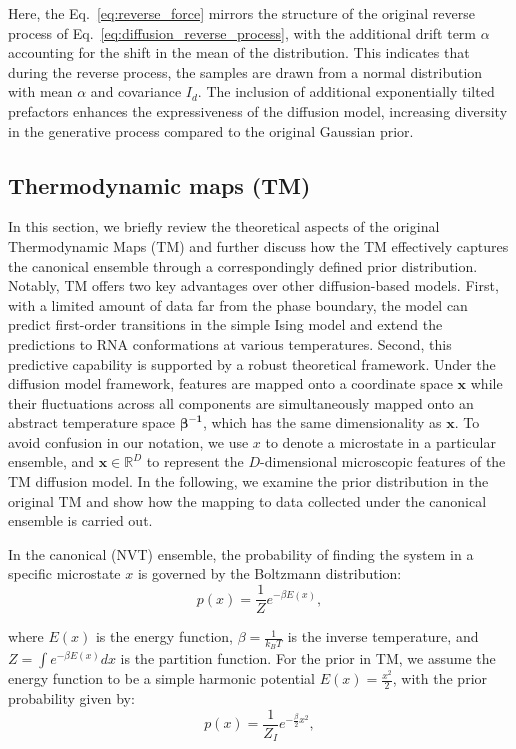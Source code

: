 \documentclass[aip,jcp,reprint,longbibliography]{revtex4-1}
\begin{document}
Here, the Eq.~\ref{eq:reverse_force} mirrors the structure of the original reverse process of Eq.~\ref{eq:diffusion_reverse_process}, with the additional drift term $\alpha$ accounting for the shift in the mean of the distribution. This indicates that during the reverse process, the samples are drawn from a normal distribution with mean $\alpha$ and covariance $I_d$. The inclusion of additional exponentially tilted prefactors enhances the expressiveness of the diffusion model, increasing diversity in the generative process compared to the original Gaussian prior.


\subsection{Thermodynamic maps (TM)}
\label{sec:ThermodynamicMaps}
In this section, we briefly review the theoretical aspects of the original Thermodynamic Maps (TM) and further discuss how the TM effectively captures the canonical ensemble through a correspondingly defined prior distribution. Notably, TM offers two key advantages over other diffusion-based models. First, with a limited amount of data far from the phase boundary, the model can predict first-order transitions in the simple Ising model and extend the predictions to RNA conformations at various temperatures. Second, this predictive capability is supported by a robust theoretical framework. 
Under the diffusion model framework, features are mapped onto a coordinate space $\mathbf{x}$ while their fluctuations across all components are simultaneously mapped onto an abstract temperature space $\boldsymbol{\beta^{-1}}$, which has the same dimensionality as $\mathbf{x}$. To avoid confusion in our notation, we use $x$ to denote a microstate in a particular ensemble, and $\mathbf{x}\in \mathbb{R}^D$ to represent the $D$-dimensional microscopic features of the TM diffusion model.
In the following, we examine the prior distribution in the original TM and show how the mapping to data collected under the canonical ensemble is carried out. 


In the canonical (NVT) ensemble, the probability of finding the system in a specific microstate $ x $ is governed by the Boltzmann distribution:
\begin{equation}
    p(x) = \frac{1}{Z} e^{-\beta E(x)},
    \label{eq:nvt_ensemble1}
\end{equation}

\noindent where $ E(x) $ is the energy function, $ \beta = \frac{1}{k_B T} $ is the inverse temperature, and $ Z = \int e^{-\beta E(x)} dx $ is the partition function. For the prior in TM, we assume the energy function to be a simple harmonic potential $ E(x) = \frac{x^2}{2} $, with the prior probability given by:
\begin{equation}
    p(x) = \frac{1}{Z_I} e^{-\frac{\beta}{2} x^2},
    \label{eq:nvt_ensemble2}
\end{equation}
\end{document}
